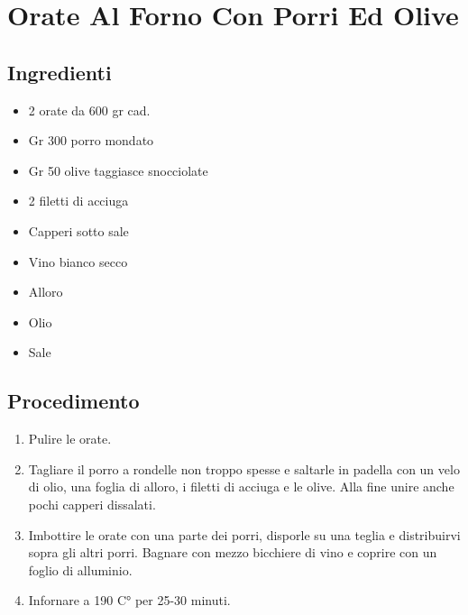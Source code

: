 \section{Orate Al Forno Con Porri Ed Olive}
\subsection{Ingredienti}
\begin{itemize}
\item 2 orate da 600 gr cad.  
\item Gr 300 porro mondato  
\item Gr 50 olive taggiasce snocciolate  
\item 2 filetti di acciuga   
\item Capperi sotto sale  
\item Vino bianco secco  
\item Alloro  
\item Olio  
\item Sale
\end{itemize}
\subsection{Procedimento}
\begin{enumerate}
\item  Pulire le orate.  
\item  Tagliare il porro a rondelle non troppo spesse e saltarle in padella con un velo di olio, una foglia di alloro, i filetti di acciuga e le olive. Alla fine unire anche pochi capperi dissalati.  
\item  Imbottire le orate con una parte dei porri, disporle su una teglia e distribuirvi sopra gli altri porri. Bagnare con mezzo bicchiere di vino e coprire con un foglio di alluminio.  
\item  Infornare a 190 C° per 25-30 minuti.
\end{enumerate}
